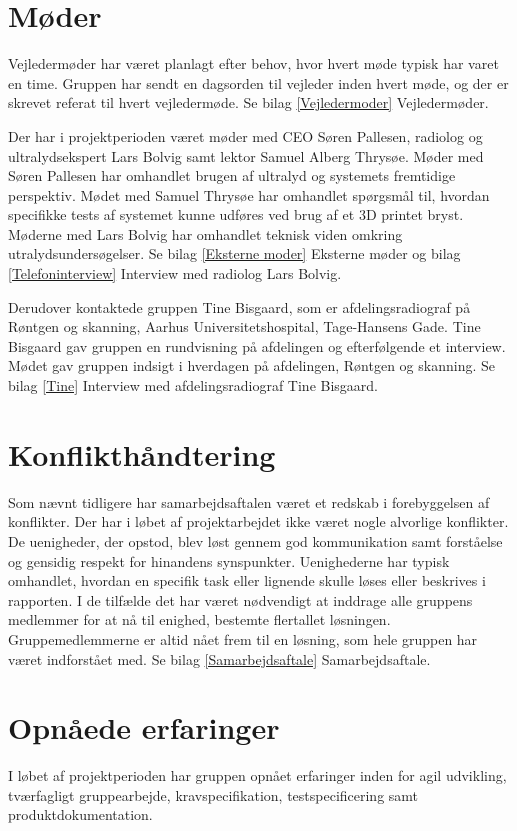 \section{Møder}
Vejledermøder har været planlagt efter behov, hvor hvert møde typisk har varet en time. Gruppen har sendt en dagsorden til vejleder inden hvert møde, og der er skrevet referat til hvert vejledermøde. Se bilag \ref{Vejledermoder} Vejledermøder.
 
Der har i projektperioden været møder med CEO Søren Pallesen, radiolog og ultralydsekspert Lars Bolvig samt lektor Samuel Alberg Thrysøe. Møder med Søren Pallesen har omhandlet brugen af ultralyd og systemets fremtidige perspektiv. Mødet med Samuel Thrysøe har omhandlet spørgsmål til, hvordan specifikke tests af systemet kunne udføres ved brug af et 3D printet bryst. Møderne med Lars Bolvig har omhandlet teknisk viden omkring utralydsundersøgelser. Se bilag \ref{Eksterne moder} Eksterne møder og bilag \ref{Telefoninterview} Interview med radiolog Lars Bolvig. 

Derudover kontaktede gruppen Tine Bisgaard, som er afdelingsradiograf på Røntgen og skanning, Aarhus Universitetshospital, Tage-Hansens Gade. Tine Bisgaard gav gruppen en rundvisning på afdelingen og efterfølgende et interview. Mødet gav gruppen indsigt i hverdagen på afdelingen, Røntgen og skanning. Se bilag \ref{Tine} Interview med afdelingsradiograf Tine Bisgaard. 

\section{Konflikthåndtering}
Som nævnt tidligere har samarbejdsaftalen været et redskab i forebyggelsen af konflikter. Der har i løbet af projektarbejdet ikke været nogle alvorlige konflikter. De uenigheder, der opstod, blev løst gennem god kommunikation samt forståelse og gensidig respekt for hinandens synspunkter. Uenighederne har typisk omhandlet, hvordan en specifik task eller lignende skulle løses eller beskrives i rapporten. I de tilfælde det har været nødvendigt at inddrage alle gruppens medlemmer for at nå til enighed, bestemte flertallet løsningen. Gruppemedlemmerne er altid nået frem til en løsning, som hele gruppen har været indforstået med. Se bilag \ref{Samarbejdsaftale} Samarbejdsaftale. 

\section{Opnåede erfaringer}
I løbet af projektperioden har gruppen opnået erfaringer inden for agil udvikling, tværfagligt gruppearbejde, kravspecifikation, testspecificering samt produktdokumentation.

